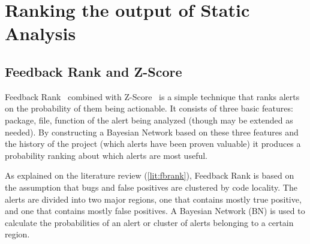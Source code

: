 
\section{Ranking the output of Static Analysis}\label{sec:ranking}



\subsection{Feedback Rank and Z-Score}


Feedback Rank~\cite{correlation_exploitation} combined with Z-Score~\cite{z-ranking} is a simple technique that ranks alerts on the probability of them being actionable.
 It consists of three basic features: package, file, function of the alert being analyzed (though may be extended as needed). 
By constructing a Bayesian Network based on these three features and the history of the project (which alerts have been proven valuable) it produces a probability ranking about which alerts are most useful. 


As explained on the literature review (\cref{lit:fbrank}), Feedback Rank is based on the assumption that bugs and false positives are clustered by code locality. The alerts are divided into two major regions, one that contains mostly true positive, and one that contains mostly false positives. A Bayesian Network (BN) is used to calculate the probabilities of an alert or cluster of alerts belonging to a certain region.

